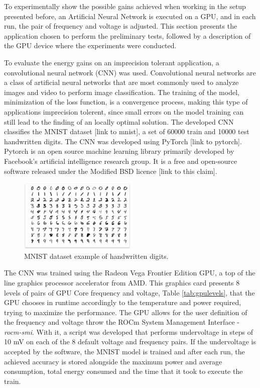 To experimentally show the possible gains achieved when working in the setup presented before, an Artificial Neural Network is executed on a GPU, and in each run, the pair of frequency and voltage is adjusted. This section presents the application chosen to perform the preliminary tests, followed by a description of the GPU device where the experiments were conducted.

To evaluate the energy gains on an imprecision tolerant application, a convolutional neural network (CNN) was used. Convolutional neural networks are a class of artificial neural networks that are most commonly used to analyze images and video to perform image classification. The training of the model, minimization of the loss function, is a convergence process, making this type of applications imprecision tolerent, since small errors on the model training can still lead to the finding of an locally optimal solution.
The developed CNN classifies the MNIST dataset [link to mnist], a set of 60000 train and 10000 test handwritten digits. The CNN was developed using PyTorch [link to pytorch]. Pytorch is an open source machine learning library primarily developed by Facebook's artificial intelligence research group. It is a free and open-source  software released under the Modified BSD licence [link to this claim]. 

\begin{figure}[!htb]
  \centering
  \includegraphics[width=0.5\textwidth]{Figures/DL/mnist.png}
  \caption[]{MNIST dataset example of handwritten digits.}
  \label{fig:mnist}
\end{figure}

The CNN was trained using the Radeon Vega Frontier Edition GPU, a top of the line graphics processor accelerator from AMD. This graphics card presents 8 levels of pairs of GPU Core frequency and voltage, Table \ref{tab:gpulevels}, that the GPU chooses in runtime accordingly to the temperature and power required, trying to maximize the performance. The GPU allows for the user definition of the frequency and voltage throw the ROCm System Management Interface - \textit{rocm-smi}. With it, a script was developed that performs undervoltage in steps of 10 mV on each of the 8 default voltage and frequency pairs. If the undervoltage is accepted by the software, the MNIST model is trained and after each run, the achieved accuracy is stored alongside the maximum power and average consumption, total energy consumed and the time that it took to execute the train.






